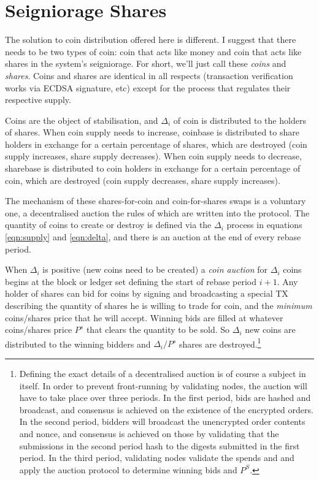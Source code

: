 \documentclass[twocolumn]{article}
\begin{document}
\section*{Seigniorage Shares}
The solution to coin distribution offered here is different. I suggest
that there needs to be two types of coin: coin that acts like money
and coin that acts like shares in the system's seigniorage. For short,
we'll just call these \emph{coins} and \emph{shares}. Coins and shares
are identical in all respects (transaction verification works via
ECDSA signature, etc) except for the process that regulates their
respective supply.

Coins are the object of stabilisation, and $\Delta_{i}$ of coin is
distributed to the holders of shares. When coin supply needs to
increase, coinbase is distributed to share holders in exchange for a
certain percentage of shares, which are destroyed (coin supply
increases, share supply decreases). When coin supply needs to
decrease, sharebase is distributed to coin holders in exchange for a
certain percentage of coin, which are destroyed (coin supply
decreases, share supply increases). 

The mechanism of these shares-for-coin and coin-for-shares swaps is a
voluntary one, a decentralised auction the rules of which are written
into the protocol. The quantity of coins to create or destroy is
defined via the $\Delta_{i}$ process in equations \ref{eqn:supply} and
\ref{eqn:delta}, and there is an auction at the end of every rebase
period. 

When $\Delta_{i}$ is positive (new coins need to be created) a
\emph{coin auction} for $\Delta_{i}$ coins begins at the block or
ledger set defining the start of rebase period $i+1$. Any holder of
shares can bid for coins by signing and broadcasting a special TX
describing the quantity of shares he is willing to trade for coin, and
the \emph{minimum} coins/shares price that he will accept. Winning
bids are filled at whatever coins/shares price $P^{s}$ that clears the
quantity to be sold. So $\Delta_{i}$ new coins are distributed to the
winning bidders and $\Delta_{i}/P^{s}$ shares are
destroyed.\footnote{Defining the exact details of a decentralised
  auction is of course a subject in itself. In order to prevent
  front-running by validating nodes, the auction will have to take
  place over three periods. In the first period, bids are hashed and
  broadcast, and consensus is achieved on the existence of the
  encrypted orders. In the second period, bidders will broadcast the
  unencrypted order contents and nonce, and consensus is achieved on
  those by validating that the submissions in the second period hash
  to the digests submitted in the first period. In the third period,
  validating nodes validate the spends and and apply the auction
  protocol to determine winning bids and $P^{S}$.}
\end{document}
